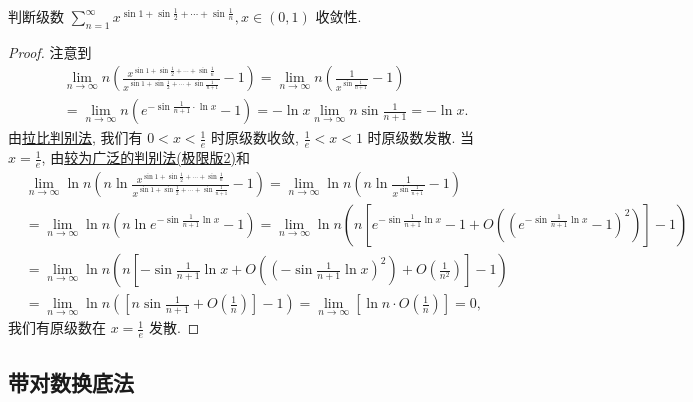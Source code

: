 \documentclass[../../main.tex]{subfiles}
\begin{document}
\begin{example}
判断级数 $\sum_{n=1}^{\infty} x^{\sin 1 + \sin \frac{1}{2} + \cdots + \sin \frac{1}{n}}, x \in (0,1)$ 收敛性.
\end{example}
\begin{proof}
注意到
\begin{align*}
&\lim_{n \to \infty} n \left( \frac{x^{\sin 1 + \sin \frac{1}{2} + \cdots + \sin \frac{1}{n}}}{x^{\sin 1 + \sin \frac{1}{2} + \cdots + \sin \frac{1}{n+1}}} - 1 \right) = \lim_{n \to \infty} n \left( \frac{1}{x^{\sin \frac{1}{n+1}}} - 1 \right) \\
&= \lim_{n \to \infty} n \left( e^{-\sin \frac{1}{n+1} \cdot \ln x} - 1 \right) = -\ln x \lim_{n \to \infty} n \sin \frac{1}{n+1} = -\ln x.
\end{align*}
由\hyperref[theorem:拉比判别法]{拉比判别法}, 我们有 $0 < x < \frac{1}{e}$ 时原级数收敛, $\frac{1}{e} < x < 1$ 时原级数发散. 当 $x = \frac{1}{e}$, 由\hyperref[theorem:较为广泛的判别法]{较为广泛的判别法(极限版2)}和
\begin{align*}
&\lim_{n \to \infty} \ln n \left( n \ln \frac{x^{\sin 1 + \sin \frac{1}{2} + \cdots + \sin \frac{1}{n}}}{x^{\sin 1 + \sin \frac{1}{2} + \cdots + \sin \frac{1}{n+1}}} - 1 \right) = \lim_{n \to \infty} \ln n \left( n \ln \frac{1}{x^{\sin \frac{1}{n+1}}} - 1 \right) \\
&= \lim_{n \to \infty} \ln n \left( n \ln e^{-\sin \frac{1}{n+1} \ln x} - 1 \right) = \lim_{n \to \infty} \ln n \left( n \left[ e^{-\sin \frac{1}{n+1} \ln x} - 1 + O \left( \left( e^{-\sin \frac{1}{n+1} \ln x} - 1 \right)^2 \right) \right] - 1 \right) \\
&= \lim_{n \to \infty} \ln n \left( n \left[ -\sin \frac{1}{n+1} \ln x + O \left( \left( -\sin \frac{1}{n+1} \ln x \right)^2 \right) + O \left( \frac{1}{n^2} \right) \right] - 1 \right) \\
&= \lim_{n \to \infty} \ln n \left( \left[ n \sin \frac{1}{n+1} + O \left( \frac{1}{n} \right) \right] - 1 \right) = \lim_{n \to \infty} \left[ \ln n \cdot O \left( \frac{1}{n} \right) \right] = 0,
\end{align*}
我们有原级数在 $x = \frac{1}{e}$ 发散.

\end{proof}



\subsection{带对数换底法}
\end{document}
